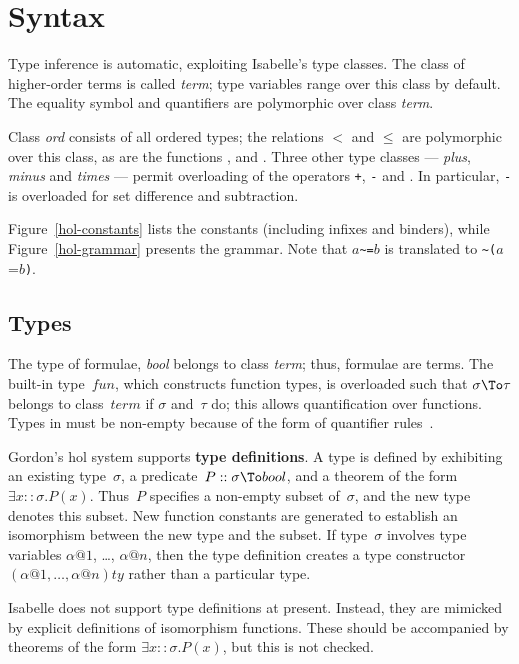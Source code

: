 \section{Syntax}
Type inference is automatic, exploiting Isabelle's type classes.  The class
of higher-order terms is called {\it term\/}; type variables range over
this class by default.  The equality symbol and quantifiers are polymorphic
over class {\it term}.  

Class {\it ord\/} consists of all ordered types; the relations $<$ and
$\leq$ are polymorphic over this class, as are the functions
,  and .  Three other
type classes --- {\it plus}, {\it minus\/} and {\it times} --- permit
overloading of the operators {\tt+}, {\tt-} and {\tt*}.  In particular,
{\tt-} is overloaded for set difference and subtraction.

Figure~\ref{hol-constants} lists the constants (including infixes and
binders), while Figure~\ref{hol-grammar} presents the grammar.  Note that
$a$\verb|~=|$b$ is translated to \verb|~(|$a$=$b$\verb|)|.

\subsection{Types}
The type of formulae, {\it bool} belongs to class {\it term}; thus,
formulae are terms.  The built-in type~$fun$, which constructs function
types, is overloaded such that $\sigma\To\tau$ belongs to class~$term$ if
$\sigma$ and~$\tau$ do; this allows quantification over functions.  Types
in {\HOL} must be non-empty because of the form of quantifier
rules~\cite[\S7]{paulson-COLOG}.

Gordon's {\sc hol} system supports {\bf type definitions}.  A type is
defined by exhibiting an existing type~$\sigma$, a predicate~$P::\sigma\To
bool$, and a theorem of the form $\exists x::\sigma.P(x)$.  Thus~$P$
specifies a non-empty subset of~$\sigma$, and the new type denotes this
subset.  New function constants are generated to establish an isomorphism
between the new type and the subset.  If type~$\sigma$ involves type
variables $\alpha@1$, \ldots, $\alpha@n$, then the type definition creates
a type constructor $(\alpha@1,\ldots,\alpha@n)ty$ rather than a particular
type.

Isabelle does not support type definitions at present.  Instead, they are
mimicked by explicit definitions of isomorphism functions.  These should be
accompanied by theorems of the form $\exists x::\sigma.P(x)$, but this is
not checked.


